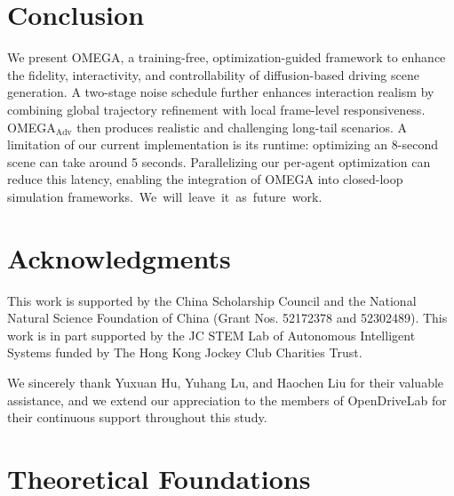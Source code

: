 \documentclass[10pt,twocolumn,letterpaper]{article}
\theoremstyle{plain}
\theoremstyle{remark}
\begin{document}
\section{Conclusion}
We present OMEGA, a training-free, optimization-guided framework to enhance the fidelity, interactivity, and controllability of diffusion-based driving scene generation. A two-stage noise schedule further enhances interaction realism by combining global trajectory refinement with local frame-level responsiveness. OMEGA$_\mathrm{Adv}$ then produces realistic and challenging long-tail scenarios. A limitation of our current implementation is its runtime: optimizing an 8-second scene can take around 5 seconds. Parallelizing our per-agent optimization can reduce this latency, enabling the integration of OMEGA into closed-loop simulation \mbox{frameworks. We will leave it as future work}.

\section*{Acknowledgments}
This work is supported by the China Scholarship Council and the National Natural Science Foundation of China (Grant Nos. 52172378 and 52302489). This work is in part supported by the JC STEM Lab of Autonomous Intelligent Systems funded by The Hong Kong Jockey Club Charities Trust.

We sincerely thank Yuxuan Hu, Yuhang Lu, and Haochen Liu for their valuable assistance, and we extend our appreciation to the members of OpenDriveLab for their continuous support throughout this study.

{
    \small
    
    
}

\clearpage
\appendix
\maketitlesupplementary

\renewcommand{\thefigure}{A\arabic{figure}}
\renewcommand{\thetable}{A\arabic{table}}
\renewcommand{\theequation}{A\arabic{equation}}
\setcounter{figure}{0}
\setcounter{table}{0}
\setcounter{equation}{0}


\section{Theoretical Foundations}
\end{document}
